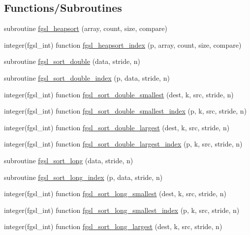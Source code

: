 \subsection*{Functions/\+Subroutines}
\begin{DoxyCompactItemize}
\item 
subroutine \hyperlink{sort_8finc_a29c0ed778f056399d921407b94883bb0}{fgsl\+\_\+heapsort} (array, count, size, compare)
\item 
integer(fgsl\+\_\+int) function \hyperlink{sort_8finc_a3f576ca19a0cc0b7cc24ccd80ac5d7d2}{fgsl\+\_\+heapsort\+\_\+index} (p, array, count, size, compare)
\item 
subroutine \hyperlink{sort_8finc_a1dec49e9c2067642bb4a24ccd7939fe4}{fgsl\+\_\+sort\+\_\+double} (data, stride, n)
\item 
subroutine \hyperlink{sort_8finc_adf92649e442927793bb64d8e6c627b64}{fgsl\+\_\+sort\+\_\+double\+\_\+index} (p, data, stride, n)
\item 
integer(fgsl\+\_\+int) function \hyperlink{sort_8finc_a7737cd05792ca6276f0f0abf3ec7e35e}{fgsl\+\_\+sort\+\_\+double\+\_\+smallest} (dest, k, src, stride, n)
\item 
integer(fgsl\+\_\+int) function \hyperlink{sort_8finc_abc3f234c4b7c8fcdb2e5a6ee28c96a84}{fgsl\+\_\+sort\+\_\+double\+\_\+smallest\+\_\+index} (p, k, src, stride, n)
\item 
integer(fgsl\+\_\+int) function \hyperlink{sort_8finc_abbfdbcc768b9fc574bca1aabd5c4ea6f}{fgsl\+\_\+sort\+\_\+double\+\_\+largest} (dest, k, src, stride, n)
\item 
integer(fgsl\+\_\+int) function \hyperlink{sort_8finc_af27bfe3694fe4135ad32cc5d042430da}{fgsl\+\_\+sort\+\_\+double\+\_\+largest\+\_\+index} (p, k, src, stride, n)
\item 
subroutine \hyperlink{sort_8finc_a964150c5e4c1e9126d3e5c133d4cf874}{fgsl\+\_\+sort\+\_\+long} (data, stride, n)
\item 
subroutine \hyperlink{sort_8finc_a6deeedcc9a03ca18bc0fbaddfc4c57bb}{fgsl\+\_\+sort\+\_\+long\+\_\+index} (p, data, stride, n)
\item 
integer(fgsl\+\_\+int) function \hyperlink{sort_8finc_ab63afc3e56f9ed94c784637dc54be97b}{fgsl\+\_\+sort\+\_\+long\+\_\+smallest} (dest, k, src, stride, n)
\item 
integer(fgsl\+\_\+int) function \hyperlink{sort_8finc_ad008a109280ac9782800fdb013a41ce9}{fgsl\+\_\+sort\+\_\+long\+\_\+smallest\+\_\+index} (p, k, src, stride, n)
\item 
integer(fgsl\+\_\+int) function \hyperlink{sort_8finc_a732fd6a26c63eb3ed81178d8dc4dd128}{fgsl\+\_\+sort\+\_\+long\+\_\+largest} (dest, k, src, stride, n)

\end{DoxyCompactItemize}
